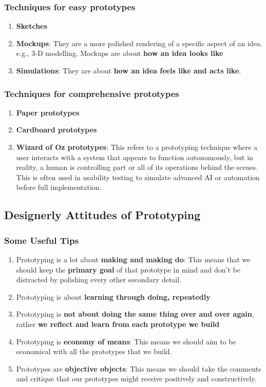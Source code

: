 \documentclass[math,code]{amznotes}
\theoremstyle{remark}
\begin{document}
\subsubsection{Techniques for easy prototypes}
\begin{enumerate}
    \item \textbf{Sketches}
    \item \textbf{Mockups}: They are a more polished rendering of a specific aspect of an idea. e.g., 3-D modelling. Mockups are about \textbf{how an idea looks like}
    \item \textbf{Simulations}: They are about \textbf{how an idea feels like and acts like}.
\end{enumerate}
\subsubsection{Techniques for comprehensive prototypes}
\begin{enumerate}
    \item \textbf{Paper prototypes}
    \item \textbf{Cardboard prototypes}
    \item \textbf{Wizard of Oz prototypes}: This refers to a prototyping technique where a user interacts with a system that appears to function autonomously, but in reality, a human is controlling part or all of its operations behind the scenes. This is often used in usability testing to simulate advanced AI or automation before full implementation.
\end{enumerate}

\subsection{Designerly Attitudes of Prototyping}
\subsubsection{Some Useful Tips}
\begin{enumerate}
    \item Prototyping is a lot about \textbf{making and making do}: This means that we should keep the \textbf{primary goal} of that prototype in mind and don't be distracted by polishing every other secondary detail.
    \item Prototyping is about \textbf{learning through doing, repeatedly}
    \item Prototyping is \textbf{not about doing the same thing over and over again}, rather \textbf{we reflect and learn from each prototype we build}
    \item Prototyping is \textbf{economy of means}: This means we should aim to be economical with all the prototypes that we build. 
    \item Prototypes are \textbf{objective objects}: This means we should take the comments and critique that our prototypes might receive positively and constructively.
\end{enumerate}
\end{document}
